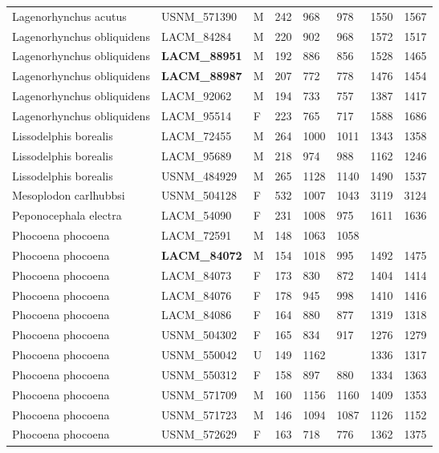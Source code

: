 \begin{longtable}{|p{1in}p{1in}p{.15in}p{.4in}p{.4in}p{.5in}p{.5in}p{.75in}|}
  Lagenorhynchus acutus & USNM\_571390 & M & 242 & 968 & 978 & 1550 & 1567 \\ 
  Lagenorhynchus obliquidens & LACM\_84284 & M & 220 & 902 & 968 & 1572 & 1517 \\ 
  Lagenorhynchus obliquidens & \textbf{ LACM\_88951 } & M & 192 & 886 & 856 & 1528 & 1465 \\ 
  Lagenorhynchus obliquidens & \textbf{ LACM\_88987 } & M & 207 & 772 & 778 & 1476 & 1454 \\ 
  Lagenorhynchus obliquidens & LACM\_92062 & M & 194 & 733 & 757 & 1387 & 1417 \\ 
  Lagenorhynchus obliquidens & LACM\_95514 & F & 223 & 765 & 717 & 1588 & 1686 \\ 
  Lissodelphis borealis & LACM\_72455 & M & 264 & 1000 & 1011 & 1343 & 1358 \\ 
  Lissodelphis borealis & LACM\_95689 & M & 218 & 974 & 988 & 1162 & 1246 \\ 
  Lissodelphis borealis & USNM\_484929 & M & 265 & 1128 & 1140 & 1490 & 1537 \\ 
  Mesoplodon carlhubbsi & USNM\_504128 & F & 532 & 1007 & 1043 & 3119 & 3124 \\ 
  Peponocephala electra & LACM\_54090 & F & 231 & 1008 & 975 & 1611 & 1636 \\ 
  Phocoena phocoena & LACM\_72591 & M & 148 & 1063 & 1058 &  &  \\ 
  Phocoena phocoena & \textbf{ LACM\_84072 } & M & 154 & 1018 & 995 & 1492 & 1475 \\ 
  Phocoena phocoena & LACM\_84073 & F & 173 & 830 & 872 & 1404 & 1414 \\ 
  Phocoena phocoena & LACM\_84076 & F & 178 & 945 & 998 & 1410 & 1416 \\ 
  Phocoena phocoena & LACM\_84086 & F & 164 & 880 & 877 & 1319 & 1318 \\ 
  Phocoena phocoena & USNM\_504302 & F & 165 & 834 & 917 & 1276 & 1279 \\ 
  Phocoena phocoena & USNM\_550042 & U & 149 & 1162 &  & 1336 & 1317 \\ 
  Phocoena phocoena & USNM\_550312 & F & 158 & 897 & 880 & 1334 & 1363 \\ 
  Phocoena phocoena & USNM\_571709 & M & 160 & 1156 & 1160 & 1409 & 1353 \\ 
  Phocoena phocoena & USNM\_571723 & M & 146 & 1094 & 1087 & 1126 & 1152 \\ 
  Phocoena phocoena & USNM\_572629 & F & 163 & 718 & 776 & 1362 & 1375 \\ 

\end{longtable}
